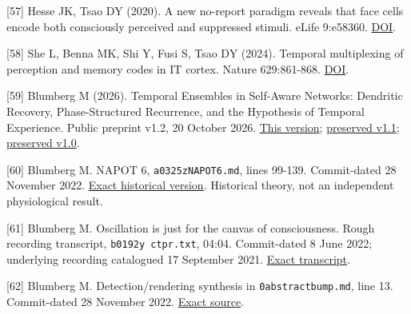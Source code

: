 \documentclass[
  american,
  11pt,
  letterpaper,
]{article}
\begin{document}
{[}57{]} Hesse JK, Tsao DY (2020). A new no-report paradigm reveals that face cells encode both consciously perceived and suppressed stimuli. eLife 9:e58360. \href{https://doi.org/10.7554/eLife.58360}{DOI}.

{[}58{]} She L, Benna MK, Shi Y, Fusi S, Tsao DY (2024). Temporal multiplexing of perception and memory codes in IT cortex. Nature 629:861-868. \href{https://doi.org/10.1038/s41586-024-07349-5}{DOI}.

{[}59{]} Blumberg M (2026). Temporal Ensembles in Self-Aware Networks: Dendritic Recovery, Phase-Structured Recurrence, and the Hypothesis of Temporal Experience. Public preprint v1.2, 20 October 2026. \href{https://doi.org/10.5281/zenodo.23509960}{This version}; \href{https://doi.org/10.5281/zenodo.23455800}{preserved v1.1}; \href{https://doi.org/10.5281/zenodo.22924518}{preserved v1.0}.

{[}60{]} Blumberg M. NAPOT 6, \texttt{a0325zNAPOT6.md}, lines 99-139. Commit-dated 28 November 2022. \href{https://github.com/v5ma/selfawarenetworks/blob/4e0cf1ee0975c01dc57182368497d3f0cd864030/a0325zNAPOT6.md\#L99}{Exact historical version}. Historical theory, not an independent physiological result.

{[}61{]} Blumberg M. Oscillation is just for the canvas of consciousness. Rough recording transcript, \texttt{b0192y\ ctpr.txt}, 04:04. Commit-dated 8 June 2022; underlying recording catalogued 17 September 2021. \href{https://github.com/v5ma/selfawarenetworks/blob/09b8306fbb54536e20ba1071e91dff0cb8a4770f/b0192y\%20ctpr.txt\#L21}{Exact transcript}.

{[}62{]} Blumberg M. Detection/rendering synthesis in \texttt{0abstractbump.md}, line 13. Commit-dated 28 November 2022. \href{https://github.com/v5ma/selfawarenetworks/blob/4e0cf1ee0975c01dc57182368497d3f0cd864030/0abstractbump.md\#L13}{Exact source}.

\endgroup
\end{document}
